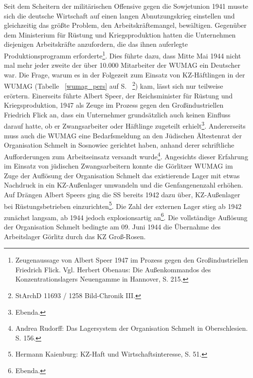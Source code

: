\documentclass[a4paper,12pt,ngerman,
]{nisebook}
\begin{document}
Seit dem Scheitern der militärischen Offensive gegen die Sowjetunion 1941 musste sich die deutsche Wirtschaft auf einen langen Abnutzungskrieg einstellen und gleichzeitig das größte Problem, den Arbeitskräftemangel, bewältigen. Gegenüber dem Ministerium für Rüstung und Kriegsproduktion hatten die Unternehmen diejenigen Arbeitskräfte anzufordern, die das ihnen auferlegte Produktionsprogramm erforderte\footnote{Zeugenaussage von Albert Speer 1947 im Prozess gegen den Großindustriellen Friedrich Flick. Vgl. Herbert Obenaus: Die Außenkommandos des Konzentrationslagers Neuengamme in Hannover, S. 215.}. Dies führte dazu, dass Mitte Mai 1944 nicht mal mehr jeder zweite der über 10.000 Mitarbeiter der WUMAG ein Deutscher war. Die Frage, warum es in der Folgezeit zum Einsatz von KZ-Häftlingen in der WUMAG (Tabelle ~\ref{wumag_pers} auf S. ~\pageref{wumag_pers}\footnote{StArchD 11693 / 1258 Bild-Chronik III.}) kam, lässt sich nur teilweise erörtern. Einerseits führte Albert Speer, der Reichsminister für Rüstung und Kriegsproduktion, 1947 als Zeuge im Prozess gegen den Großindustriellen Friedrich Flick an, dass ein Unternehmer \glqq grundsätzlich auch keinen Einfluss darauf hatte, ob er Zwangsarbeiter oder Häftlinge zugeteilt erhielt\grqq\footnote{Ebenda.}. Andererseits muss auch die WUMAG eine Bedarfsmeldung an den Jüdischen Ältestenrat der Organisation Schmelt in Sosnowiec gerichtet haben, anhand derer schriftliche Aufforderungen zum Arbeitseinsatz versandt wurde\footnote{Andrea Rudorff: Das Lagersystem der Organisation Schmelt in Oberschlesien. S. 156.}. Angesichts dieser Erfahrung im Einsatz von jüdischen Zwangsarbeitern konnte die Görlitzer WUMAG im Zuge der Auflösung der Organisation Schmelt das existierende Lager mit etwas Nachdruck in ein KZ-Außenlager umwandeln und die Genfangenenzahl erhöhen.
\\
Auf Drängen Albert Speers ging die SS bereits 1942 dazu über, KZ-Außenlager bei Rüstungsbetrieben einzurichten\footnote{Hermann Kaienburg: KZ-Haft und Wirtschaftsinteresse, S. 51.}. Die Zahl der externen Lager stieg ab 1942 zunächst langsam, ab 1944 jedoch explosionsartig an\footnote{Ebenda.}. Die vollständige Auflösung der Organisation Schmelt bedingte am 09. Juni 1944 die Übernahme des Arbeitslager Görlitz durch das KZ Groß-Rosen.
~\newline
\end{document}
